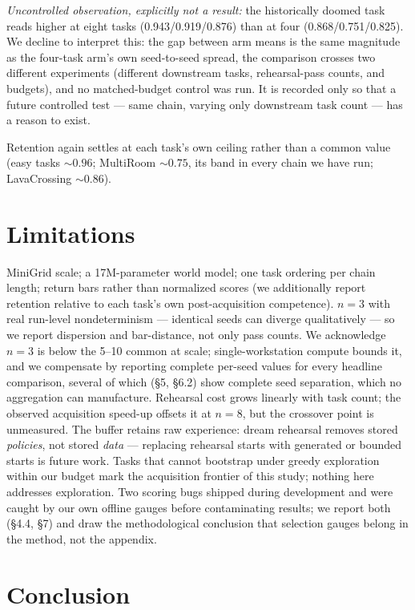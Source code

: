 \documentclass[10pt]{article}
\begin{document}
\emph{Uncontrolled observation, explicitly not a result:} the historically doomed task reads higher at
eight tasks (0.943/0.919/0.876) than at four (0.868/0.751/0.825). We decline to interpret
this: the gap between arm means is the same magnitude as the four-task arm's own
seed-to-seed spread, the comparison crosses two different experiments (different downstream
tasks, rehearsal-pass counts, and budgets), and no matched-budget control was run. It is
recorded only so that a future controlled test --- same chain, varying only downstream task
count --- has a reason to exist.

Retention again settles at each task's own ceiling rather than a common value (easy tasks
${\sim}0.96$; MultiRoom ${\sim}0.75$, its band in every chain we have run; LavaCrossing
${\sim}0.86$).

\section{Limitations}

MiniGrid scale; a 17M-parameter world model; one task ordering per chain length; return bars
rather than normalized scores (we additionally report retention relative to each task's own
post-acquisition competence). $n{=}3$ with real run-level nondeterminism --- identical seeds
can diverge qualitatively --- so we report dispersion and bar-distance, not only pass
counts. We acknowledge $n{=}3$ is below the 5--10 common at scale; single-workstation compute
bounds it, and we compensate by reporting complete per-seed values for every headline
comparison, several of which (\S5, \S6.2) show complete seed separation, which no
aggregation can manufacture. Rehearsal cost grows linearly with task count; the observed acquisition speed-up
offsets it at $n{=}8$, but the crossover point is unmeasured. The buffer retains raw
experience: dream rehearsal removes stored \emph{policies}, not stored \emph{data} ---
replacing rehearsal starts with generated or bounded starts is future work. Tasks that
cannot bootstrap under greedy exploration within our budget mark the acquisition frontier of
this study; nothing here addresses exploration. Two scoring bugs shipped during development
and were caught by our own offline gauges before contaminating results; we report both
(\S4.4, \S7) and draw the methodological conclusion that selection gauges belong in the
method, not the appendix.

\section{Conclusion}
\end{document}
